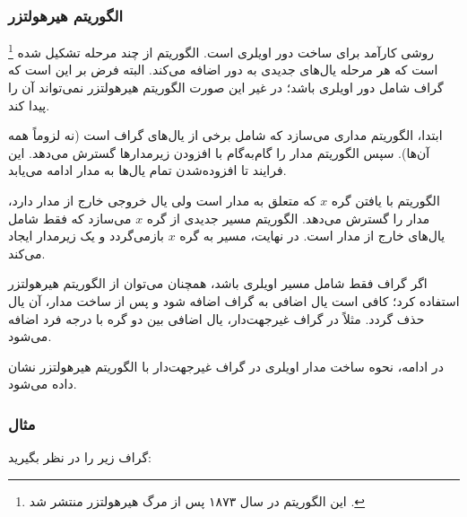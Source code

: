 \subsubsection{الگوریتم هیرهولتزر}


\footnote{این الگوریتم در سال ۱۸۷۳ پس از مرگ هیرهولتزر منتشر شد \cite{hie73}.} روشی کارآمد
برای ساخت
دور اویلری است.
الگوریتم از چند مرحله تشکیل شده است
که هر مرحله یال‌های جدیدی به دور اضافه می‌کند.
البته فرض بر این است که گراف شامل
دور اویلری باشد؛ در غیر این صورت الگوریتم هیرهولتزر
نمی‌تواند آن را پیدا کند.

ابتدا، الگوریتم مداری می‌سازد که شامل
برخی از یال‌های گراف است (نه لزوماً همه آن‌ها).
سپس الگوریتم مدار را گام‌به‌گام با افزودن زیرمدارها
گسترش می‌دهد.
این فرایند تا افزوده‌شدن تمام یال‌ها
به مدار ادامه می‌یابد.

الگوریتم با یافتن گره $x$ که متعلق به مدار است
ولی یال خروجی خارج از مدار دارد، مدار را گسترش می‌دهد.
الگوریتم مسیر جدیدی از گره $x$ می‌سازد
که فقط شامل یال‌های خارج از مدار است.
در نهایت، مسیر به گره $x$ بازمی‌گردد
و یک زیرمدار ایجاد می‌کند.

اگر گراف فقط شامل مسیر اویلری باشد،
همچنان می‌توان از الگوریتم هیرهولتزر استفاده کرد؛
کافی است یال اضافی به گراف اضافه شود
و پس از ساخت مدار، آن یال حذف گردد.
مثلاً در گراف غیرجهت‌دار،
یال اضافی بین دو گره با درجه فرد اضافه می‌شود.

در ادامه، نحوه ساخت مدار اویلری در گراف غیرجهت‌دار
با الگوریتم هیرهولتزر نشان داده می‌شود.

\subsubsection{مثال}

\begin{samepage}
گراف زیر را در نظر بگیرید:
\begin{center}
\end{center}
\end{samepage}


